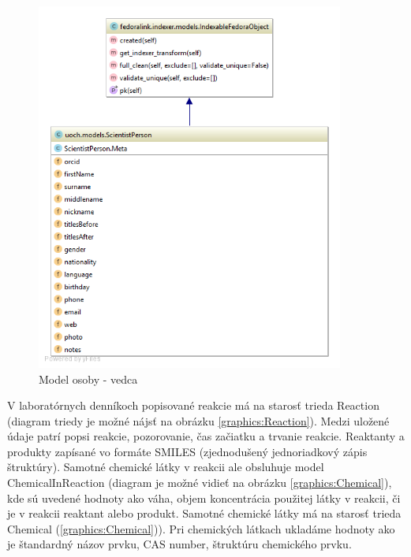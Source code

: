 \documentclass[thesis=M,slovak]{FITthesis}[2013/05/06]
\begin{document}
\begin{figure}\centering
	\includegraphics[width=0.9\textwidth]{diagramy/UOCH_ScientistPerson.png}
 	\caption[Model osoby - vedca]{Model osoby - vedca}\label{graphics:ScientistPerson}
\end{figure}

V laboratórnych denníkoch popisované reakcie má na starosť trieda Reaction (diagram triedy je možné nájsť na obrázku \ref{graphics:Reaction}). Medzi uložené údaje patrí popsi reakcie, pozorovanie, čas začiatku a trvanie reakcie. Reaktanty a produkty zapísané vo formáte SMILES (zjednodušený jednoriadkový zápis štruktúry). Samotné chemické látky v reakcii ale obsluhuje model ChemicalInReaction (diagram je možné vidieť na obrázku \ref{graphics:Chemical}), kde sú uvedené hodnoty ako váha, objem koncentrácia použitej látky v reakcii, či je v reakcii reaktant alebo produkt. Samotné chemické látky má na starosť trieda Chemical (\ref{graphics:Chemical})). Pri chemických látkach ukladáme hodnoty ako je štandardný názov prvku, CAS number, štruktúru chemického prvku.
\end{document}
